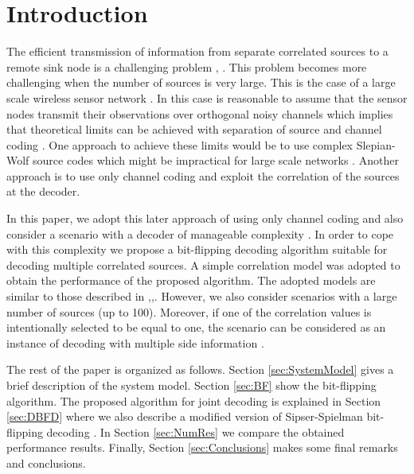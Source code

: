\documentclass[journal]{IEEEtran}
\begin{document}
\section{Introduction}\label{sec:Intro}

The efficient transmission of information from separate correlated sources to a remote 
sink node is a challenging problem \cite{raheli2011}, \cite{raheli2012}. This problem 
becomes more challenging when the number of sources is very large. This is the case 
of a large scale wireless sensor network \cite{joao}.
In this case is reasonable to assume that the sensor nodes  transmit their observations 
over orthogonal noisy channels which implies that theoretical limits can be achieved 
with separation of source and channel coding \cite{joao1}.  One approach to achieve 
these limits would be to use complex Slepian-Wolf source codes \cite{slepian} which 
might be impractical for large scale networks \cite{joao}. Another approach is to use 
only channel coding and exploit the correlation of the sources at the decoder.

In this paper, we adopt this later approach of using only channel coding and  also 
consider a scenario with a decoder of manageable complexity \cite{joao}.
In order to cope with this complexity we propose a bit-flipping decoding algorithm \cite{kou,galaguer}
suitable for decoding multiple correlated sources. A simple correlation model was 
adopted to obtain the performance of the proposed algorithm.  The adopted models are 
similar to those described in \cite{binaryceo},\cite{japao},\cite{raheli2012}. However, 
we also consider scenarios with a large number of sources (up to 100). Moreover, if one of the correlation 
values is intentionally selected to be equal to one, the scenario can be considered 
as an instance of decoding with multiple side information \cite{side}.

The rest of the paper is organized as follows. Section \ref{sec:SystemModel} gives a brief description 
of the system model. Section \ref{sec:BF} show the bit-flipping algorithm. The proposed algorithm for joint decoding is explained in 
Section \ref{sec:DBFD} where we also describe a modified version of Sipser-Spielman bit-flipping 
decoding \cite{tese}. 
In Section \ref{sec:NumRes} we compare the obtained performance results. Finally, 
Section \ref{sec:Conclusions} makes some final remarks and conclusions.

\end{document}
